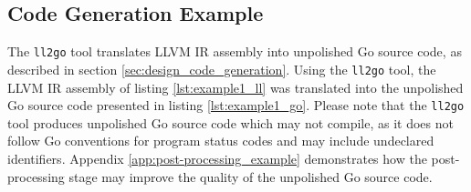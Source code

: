 
\subsection{Code Generation Example}

The \texttt{ll2go} tool translates LLVM IR assembly into unpolished Go source code, as described in section \ref{sec:design_code_generation}. Using the \texttt{ll2go} tool, the LLVM IR assembly of listing \ref{lst:example1_ll} was translated into the unpolished Go source code presented in listing \ref{lst:example1_go}. Please note that the \texttt{ll2go} tool produces unpolished Go source code which may not compile, as it does not follow Go conventions for program status codes and may include undeclared identifiers. Appendix \ref{app:post-processing_example} demonstrates how the post-processing stage may improve the quality of the unpolished Go source code.


